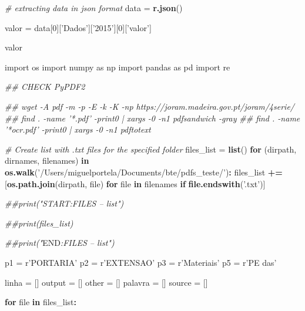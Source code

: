 \documentclass[
  12pt,
]{article}
\newenvironment{Shaded}{\begin{snugshade}}{\end{snugshade}}
\newcommand{\CommentTok}[1]{\textcolor[rgb]{0.56,0.35,0.01}{\textit{#1}}}
\newcommand{\ControlFlowTok}[1]{\textcolor[rgb]{0.13,0.29,0.53}{\textbf{#1}}}
\newcommand{\DecValTok}[1]{\textcolor[rgb]{0.00,0.00,0.81}{#1}}
\newcommand{\ErrorTok}[1]{\textcolor[rgb]{0.64,0.00,0.00}{\textbf{#1}}}
\newcommand{\KeywordTok}[1]{\textcolor[rgb]{0.13,0.29,0.53}{\textbf{#1}}}
\newcommand{\NormalTok}[1]{#1}
\newcommand{\OperatorTok}[1]{\textcolor[rgb]{0.81,0.36,0.00}{\textbf{#1}}}
\newcommand{\RegionMarkerTok}[1]{#1}
\newcommand{\StringTok}[1]{\textcolor[rgb]{0.31,0.60,0.02}{#1}}
\begin{document}
\begin{Shaded}
\begin{Highlighting}[]
\CommentTok{# extracting data in json format }
\NormalTok{data =}\StringTok{ }\KeywordTok{r.json}\NormalTok{() }

\NormalTok{valor =}\StringTok{ }\NormalTok{data[}\DecValTok{0}\NormalTok{][}\StringTok{'Dados'}\NormalTok{][}\StringTok{'2015'}\NormalTok{][}\DecValTok{0}\NormalTok{][}\StringTok{'valor'}\NormalTok{]}

\NormalTok{valor}

\NormalTok{import os}
\NormalTok{import numpy as np}
\NormalTok{import pandas as pd}
\NormalTok{import re}

\CommentTok{## CHECK PyPDF2}

\CommentTok{## wget -A pdf -m -p -E -k -K -np https://joram.madeira.gov.pt/joram/4serie/}
\CommentTok{## find . -name '*.pdf' -print0 | xargs -0 -n1 pdfsandwich -gray}
\CommentTok{## find . -name '*ocr.pdf' -print0 | xargs -0 -n1 pdftotext}

\CommentTok{# Create list with .txt files for the specified folder}
\NormalTok{files_list =}\StringTok{ }\KeywordTok{list}\NormalTok{()}
\ControlFlowTok{for}\NormalTok{ (dirpath, dirnames, filenames) }\ControlFlowTok{in} \KeywordTok{os.walk}\NormalTok{(}\StringTok{'/Users/miguelportela/Documents/bte/pdfs_teste/'}\NormalTok{)}\OperatorTok{:}
\StringTok{    }\NormalTok{files_list }\OperatorTok{+}\ErrorTok{=}\StringTok{ }\NormalTok{[}\KeywordTok{os.path.join}\NormalTok{(dirpath, file)}
                   \ControlFlowTok{for}\NormalTok{ file }\ControlFlowTok{in}\NormalTok{ filenames }\ControlFlowTok{if} \KeywordTok{file.endswith}\NormalTok{(}\StringTok{'.txt'}\NormalTok{)]}


\CommentTok{##print("START:FILES -- list")}

\CommentTok{##print(files_list)}

\CommentTok{##print("}\RegionMarkerTok{END}\CommentTok{:FILES -- list")}

\NormalTok{p1 =}\StringTok{ }\NormalTok{r}\StringTok{'PORTARIA'}
\NormalTok{p2 =}\StringTok{ }\NormalTok{r}\StringTok{'EXTENSAO'}
\NormalTok{p3 =}\StringTok{ }\NormalTok{r}\StringTok{'Materiais'}
\NormalTok{p5 =}\StringTok{ }\NormalTok{r}\StringTok{'PE das'}

\NormalTok{linha =}\StringTok{ }\NormalTok{[]}
\NormalTok{output =}\StringTok{ }\NormalTok{[]}
\NormalTok{other =}\StringTok{ }\NormalTok{[]}
\NormalTok{palavra =}\StringTok{ }\NormalTok{[]}
\NormalTok{source =}\StringTok{ }\NormalTok{[]}

\ControlFlowTok{for}\NormalTok{ file }\ControlFlowTok{in}\NormalTok{ files_list}\OperatorTok{:}


\end{Highlighting}
\end{Shaded}
\end{document}
